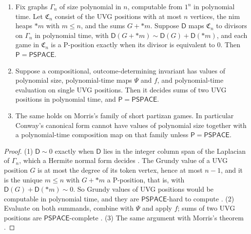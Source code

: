 \documentclass[final]{siamart0516}
\numberwithin{theorem}{section}
\numberwithin{equation}{section}
\theoremstyle{siamnonum}
\theoremstyle{plain}
\newcommand{\Dv}{\mathsf{D}}              %
\newcommand{\cls}[1]{\mathsf{#1}}
\newcommand{\PSPACE}{\cls{PSPACE}}
\newcommand{\Pclass}{\cls{P}}
\begin{document}
\begin{theorem}\label{thm:hardness}
\begin{enumerate}[label=\textup{(\arabic*)}]
\item Fix graphs $\Gamma_n$ of size polynomial in $n$, computable from $1^n$ in polynomial time. Let $\mathfrak C_n$ consist of the UVG positions with at most $n$ vertices, the nim heaps $*m$ with $m\le n$, and the sums $G+*m$. Suppose $\Dv$ maps $\mathfrak C_n$ to divisors on $\Gamma_n$ in polynomial time, with $\Dv(G+*m)\sim\Dv(G)+\Dv(*m)$, and each game in $\mathfrak C_n$ is a P-position exactly when its divisor is equivalent to $0$. Then $\Pclass=\PSPACE$.
\item Suppose a compositional, outcome-determining invariant has values of polynomial size, polynomial-time maps $\Psi$ and $f$, and polynomial-time evaluation on single UVG positions. Then it decides sums of two UVG positions in polynomial time, and $\Pclass=\PSPACE$.
\item The same holds on Morris's family of short partizan games. In particular Conway's canonical form cannot have values of polynomial size together with a polynomial-time composition map on that family unless $\Pclass=\PSPACE$.
\end{enumerate}
\end{theorem}
\begin{proof}
(1) $\Dv\sim0$ exactly when $\Dv$ lies in the integer column span of the Laplacian of $\Gamma_n$, which a Hermite normal form decides \cite{KannanBachem}. The Grundy value of a UVG position $G$ is at most the degree of its token vertex, hence at most $n-1$, and it is the unique $m\le n$ with $G+*m$ a P-position, that is, with $\Dv(G)+\Dv(*m)\sim0$. So Grundy values of UVG positions would be computable in polynomial time, and they are $\PSPACE$-hard to compute \cite{BFT}. (2) Evaluate on both summands, combine with $\Psi$ and apply $f$; sums of two UVG positions are $\PSPACE$-complete \cite{BFT}. (3) The same argument with Morris's theorem \cite{Morris}.
\end{proof}
\end{document}
